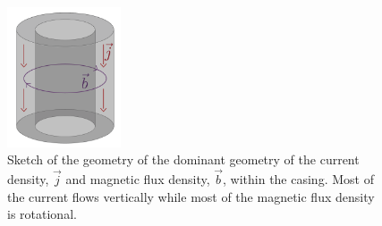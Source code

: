 \begin{figure}
    \begin{center}
    \includegraphics[width=0.3\textwidth]{figures/casing_flux_geometry.png}
    \end{center}
\caption{
    Sketch of the geometry of the dominant geometry of the current density,
    $\vec{j}$ and magnetic flux density, $\vec{b}$, within the casing.
    Most of the current flows vertically
    while most of the magnetic flux density is rotational.
}
\label{fig:casing_flux_geometry}
\end{figure}



